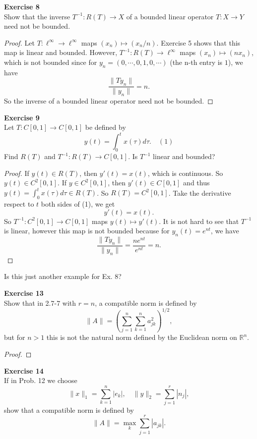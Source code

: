 \documentclass[12pt, a4paper]{article}
\theoremstyle{plain}
\newcommand{\R}{\mathbb{R}}
\newenvironment{exercise}[2][Exercise]
    { \begin{mdframed}[backgroundcolor=gray!20] \textbf{#1 #2} \\}
    {  \end{mdframed}}
\begin{document}
\begin{exercise}{8}
Show that the inverse $T^{-1}:R(T)\rightarrow X$ of a bounded linear operator $T:X\rightarrow Y$ need not be bounded.
\end{exercise}
	\begin{proof}
	Let $T:\ell^\infty\rightarrow \ell^{\infty}$ maps $(x_n)\mapsto (x_n/n)$. Exercise 5 shows that this map is linear and bounded. However, $T^{-1}:R(T)\rightarrow \ell^{\infty}$ maps $(x_n)\mapsto (nx_n)$, which is not bounded since for $y_n = (0,\cdots,0,1,0,\cdots)$ (the n-th entry is $1$), we have
	\[
	\frac{\|Ty_n\|}{\|y_n\|} = n.
	\]
	So the inverse of a bounded linear operator need not be bounded.
	\end{proof}
\begin{exercise}{9}
Let $T:C[0,1]\rightarrow C[0,1]$ be defined by
\[
y(t) = \int_{0}^{t}{x(\tau)d\tau}.\quad (1)
\]
Find $R(T)$ and $T^{-1}:R(T)\rightarrow C[0,1]$. Is $T^{-1}$ linear and bounded?
\end{exercise}
	\begin{proof}
	If $y(t)\in R(T)$, then $y'(t) = x(t)$, which is continuous. So $y(t)\in C^2[0,1]$. If $y\in C^2[0,1]$, then $y'(t)\in C[0,1]$ and thus $y(t) = \int_{0}^{t}{x(\tau)d\tau}\in R(T)$. So $R(T) = C^2[0,1]$. Take the derivative respect to $t$ both sides of (1), we get
	\[
	y'(t) = x(t).
	\]
	So $T^{-1}:C^2[0,1]\rightarrow C[0,1]$ maps $y(t)\mapsto y'(t)$. It is not hard to see that $T^{-1}$ is linear, however this map is not bounded because for $y_n(t)=e^{nt}$, we have
	\[
	\frac{\|Ty_n\|}{\|y_n\|} = \frac{ne^{nt}}{e^{nt}} = n.
	\]
	\end{proof}
Is this just another example for Ex. 8?

\begin{exercise}{13}
Show that in 2.7-7 with $r=n$, a compatible norm is defined by 
\[
\|A\|=\left(\sum_{j=1}^{n}\sum_{k=1}^{n}{a_{jk}^2}\right)^{1/2},
\]
but for $n>1$ this is not the natural norm defined by the Euclidean norm on $\R^n$.
\end{exercise}
	\begin{proof}
	
	\end{proof}

\begin{exercise}{14}
If in Prob. 12 we choose
\[
\|x\|_1=\sum_{k=1}^{n}{|e_k|},\quad \|y\|_2=\sum_{j=1}^{r}{|n_j|},
\]
show that a compatible norm is defined by 
\[
\|A\|=\max_{k}\sum_{j=1}^{r}{|a_{jk}|}.
\]
\end{exercise}
\end{document}
